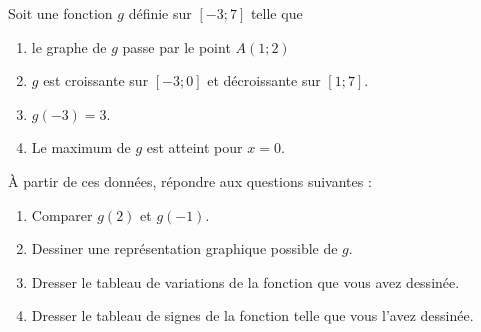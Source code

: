 
\begin{exercice}[\ldots/5]\label{exosmath-0636}

    Soit une fonction \( g\) définie sur \( [-3;7]\) telle que
    \begin{enumerate}
        \item
            le graphe de \( g\) passe par le point \( A(1;2)\)
        \item
            \( g\) est croissante sur \( [-3;0]\) et décroissante sur \( [1;7]\).
        \item
            \( g(-3)=3\).
        \item
            Le maximum de \( g\) est atteint pour \( x=0\).
    \end{enumerate}
    À partir de ces données, répondre aux questions suivantes :
    \begin{enumerate}
        \item
            Comparer \( g(2)\) et \( g(-1)\).
        \item
            Dessiner une représentation graphique possible de \( g\).
        \item
            Dresser le tableau de variations de la fonction que vous avez dessinée.
        \item
            Dresser le tableau de signes de la fonction telle que vous l'avez dessinée.
    \end{enumerate}

\end{exercice}
